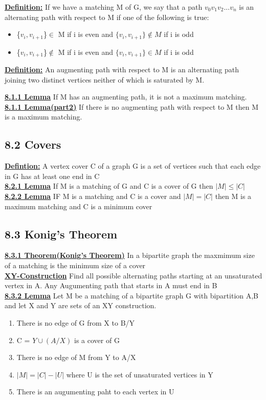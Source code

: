 \documentclass[12pt]{article}
\newcommand{\myt}[1]{\textbf{\underline{#1}}}
\begin{document}
	\myt{Definition:} If we have a matching M of G, we say that a path $v_0v_1v_2...v_n$ is an alternating path with respect to M if one of the following is true:\\
	\begin{itemize}
		\item \{$v_i,v_{i+1}$\}$\in$ M if i is even and $\{v_i,v_{i+1}\} \notin M$ if i is odd
		\item \{$v_i,v_{i+1}$\}$\notin$ M if i is even and $\{v_i,v_{i+1}\} \in M$ if i is odd
	\end{itemize}
	
	\myt{Definition:} An augmenting path with respect to M is an alternating path joining two distinct vertices neither of which is saturated by M.
	
	\myt{8.1.1 Lemma} If M has an augmenting path, it is not a maximum matching.\\
	
	\myt{8.1.1 Lemma(part2)} If there is no augmenting path with respect to M then M is a maximum matching.\\
	
	\subsection*{8.2 Covers}
	\myt{Defintion:} A vertex cover C of a graph G is a set of vertices such that each edge in G has at least one end in C\\
	
	\myt{8.2.1 Lemma} If M is a matching of G and C is a cover of G then $|M| \leq |C|$\\
	
	\myt{8.2.2 Lemma} IF M is a matching and C is a cover and $|M| = |C|$ then M is a maximum matching and C is a minimum cover\\
	
	\subsection*{8.3 Konig's Theorem}
	\myt{8.3.1 Theorem(Konig's Theorem)} In a bipartite graph the maxmimum size of a matching is the minimum size of a cover\\
	
	\myt{XY-Construction} Find all possible alternating paths starting at an unsaturated vertex in A. Any Augumenting path that starts in A must end in B\\
	
	\myt{8.3.2 Lemma} Let M be a matching of a bipartite graph G with bipartition A,B and let X and Y are sets of an XY construction.\\
	\begin{enumerate}
		\item There is no edge of G from X to B/Y
		\item C = $Y \cup (A/X)$ is a cover of G
		\item There is no edge of M from Y to A/X
		\item $|M| = |C| - |U|$ where U is the set of unsaturated vertices in Y
		\item There is an augumenting paht to each vertex in U
	\end{enumerate}
	
\end{document}
